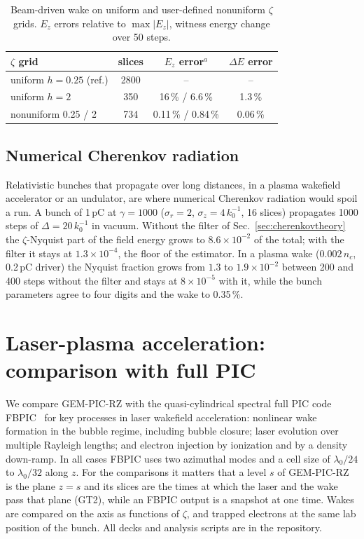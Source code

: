 \documentclass[preprint,12pt]{elsarticle}
\begin{document}
\begin{table}[!htbp]
\caption{Beam-driven wake on uniform and user-defined nonuniform $\zeta$ grids. $E_z$ errors relative to $\max|E_z|$, witness energy change over 50 steps.}\label{tab:zgrid}
\begin{tabular}{lccc}
\toprule
$\zeta$ grid & slices & $E_z$ error$^{a}$ & $\Delta E$ error \\ \midrule
uniform $h = 0.25$ (ref.) & 2800 & -- & -- \\
uniform $h = 2$ & 350 & 16\,\% / 6.6\,\% & 1.3\,\% \\
nonuniform 0.25 / 2 & 734 & 0.11\,\% / 0.84\,\% & 0.06\,\% \\
\bottomrule
\end{tabular}
\par{}
\end{table}

\subsection{Numerical Cherenkov radiation}\label{sec:cherenkov}

Relativistic bunches that propagate over long distances, in a plasma wakefield accelerator or an undulator, are where numerical Cherenkov radiation would spoil a run. A bunch of 1\,pC at $\gamma = 1000$ ($\sigma_r = 2$, $\sigma_z = 4\,k_0^{-1}$, 16 slices) propagates 1000 steps of $\Delta = 20\,k_0^{-1}$ in vacuum. Without the filter of Sec.~\ref{sec:cherenkovtheory} the $\zeta$-Nyquist part of the field energy grows to $8.6\times10^{-2}$ of the total; with the filter it stays at $1.3\times10^{-4}$, the floor of the estimator. In a plasma wake ($0.002\,n_c$, 0.2\,pC driver) the Nyquist fraction grows from $1.3$ to $1.9\times10^{-2}$ between 200 and 400 steps without the filter and stays at $8\times10^{-5}$ with it, while the bunch parameters agree to four digits and the wake to 0.35\,\%.

\section{Laser-plasma acceleration: comparison with full PIC}\label{sec:lpa}

We compare GEM-PIC-RZ with the quasi-cylindrical spectral full PIC code FBPIC~\cite{Lehe2016} for key processes in laser wakefield acceleration: nonlinear wake formation in the bubble regime, including bubble closure; laser evolution over multiple Rayleigh lengths; and electron injection by ionization and by a density down-ramp. In all cases FBPIC uses two azimuthal modes and a cell size of $\lambda_0/24$ to $\lambda_0/32$ along $z$. For the comparisons it matters that a level $s$ of GEM-PIC-RZ is the plane $z = s$ and its slices are the times at which the laser and the wake pass that plane (GT2), while an FBPIC output is a snapshot at one time. Wakes are compared on the axis as functions of $\zeta$, and trapped electrons at the same lab position of the bunch. All decks and analysis scripts are in the repository.
\end{document}
